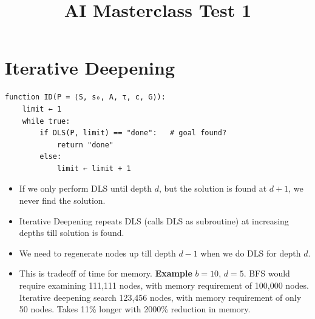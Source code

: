 \documentclass[12pt, a4paper]{article}
\title{AI Masterclass Test 1}
\author{}
\date{}
\begin{document}
\section{Iterative Deepening}
\begin{algorithm}[H]

\end{algorithm}
\begin{Verbatim}
function ID(P = ⟨S, s₀, A, τ, c, G⟩):
    limit ← 1
    while true:
        if DLS(P, limit) == "done":   # goal found?
            return "done"
        else:
            limit ← limit + 1
\end{Verbatim}

\begin{itemize}
    \item If we only perform DLS until depth $d$, but the solution is found at $d+1$, 
    we never find the solution.
    \item Iterative Deepening repeats DLS (calls DLS as subroutine) at increasing depths till solution is found.
    \item We need to regenerate nodes up till depth $d-1$ when we do DLS for depth $d$.
    \item This is tradeoff of time for memory.\newline
    \textbf{Example} $b=10$, $d=5$. BFS would require examining 111,111 nodes, with memory requirement of 100,000 nodes.
    Iterative deepening search 123,456 nodes, with memory requirement of only 50 nodes. Takes 11\% longer with 2000\% reduction in memory.
\end{itemize}
\end{document}
